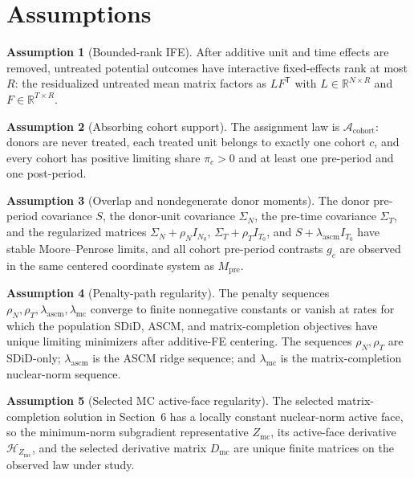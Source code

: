 \documentclass[11pt]{article}
\newcommand{\transpose}{\mathsf{T}}
\newcommand{\R}{\mathbb{R}}
\theoremstyle{definition}
\newtheorem{assumption}{Assumption}
\theoremstyle{plain}
\theoremstyle{remark}
\begin{document}
\section{Assumptions}
\begin{assumption}[Bounded-rank IFE]\label{ass:rank}
After additive unit and time effects are removed, untreated potential outcomes have interactive fixed-effects rank at most \(R\): the residualized untreated mean matrix factors as \(L F^\transpose\) with \(L\in\R^{N\times R}\) and \(F\in\R^{T\times R}\).
\end{assumption}

\begin{assumption}[Absorbing cohort support]\label{ass:cohort}
The assignment law is \(\mathcal A_{\mathrm{cohort}}\): donors are never treated, each treated unit belongs to exactly one cohort \(c\), and every cohort has positive limiting share \(\pi_c>0\) and at least one pre-period and one post-period.
\end{assumption}

\begin{assumption}[Overlap and nondegenerate donor moments]\label{ass:overlap}
The donor pre-period covariance \(S\), the donor-unit covariance \(\Sigma_N\), the pre-time covariance \(\Sigma_T\), and the regularized matrices \(\Sigma_N+\rho_N I_{N_0}\), \(\Sigma_T+\rho_T I_{T_0}\), and \(S+\lambda_{\mathrm{ascm}} I_{T_0}\) have stable Moore--Penrose limits, and all cohort pre-period contrasts \(g_c\) are observed in the same centered coordinate system as \(M_{\mathrm{pre}}\).
\end{assumption}

\begin{assumption}[Penalty-path regularity]\label{ass:penalty}
The penalty sequences \(\rho_N,\rho_T,\lambda_{\mathrm{ascm}},\lambda_{\mathrm{mc}}\) converge to finite nonnegative constants or vanish at rates for which the population SDiD, ASCM, and matrix-completion objectives have unique limiting minimizers after additive-FE centering.  The sequences \(\rho_N,\rho_T\) are SDiD-only; \(\lambda_{\mathrm{ascm}}\) is the ASCM ridge sequence; and \(\lambda_{\mathrm{mc}}\) is the matrix-completion nuclear-norm sequence.
\end{assumption}

\begin{assumption}[Selected MC active-face regularity]\label{ass:mc-active}
The selected matrix-completion solution in Section~6 has a locally constant nuclear-norm active face, so the minimum-norm subgradient representative \(Z_{\mathrm{mc}}\), its active-face derivative \(\mathcal H_{Z_{\mathrm{mc}}}\), and the selected derivative matrix \(D_{\mathrm{mc}}\) are unique finite matrices on the observed law under study.
\end{assumption}
\end{document}
